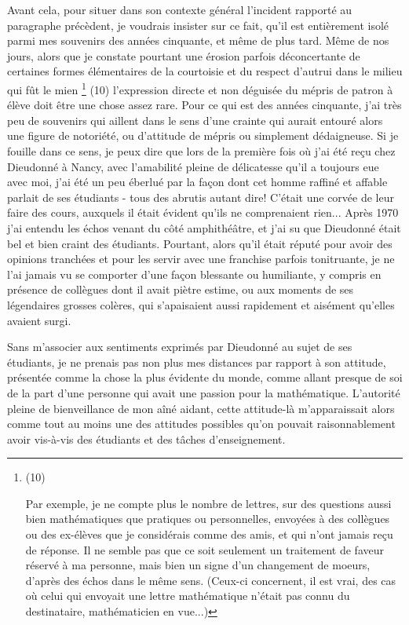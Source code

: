 Avant cela, pour situer dans son contexte général l'incident rapporté au paragraphe précèdent, je voudrais insister sur ce fait, qu'il est entièrement isolé parmi mes souvenirs des années cinquante, et même de plus tard. Même de nos jours, alors que je constate pourtant une érosion parfois déconcertante de certaines formes élémentaires de la courtoisie et du respect d'autrui dans le milieu qui fût le mien \footnote{(10)\par Par exemple, je ne compte plus le nombre de lettres, sur des questions aussi bien mathématiques que pratiques ou personnelles, envoyées à des collègues ou des ex-élèves que je considérais comme des amis, et qui n'ont jamais reçu de réponse. Il ne semble pas que ce soit seulement un traitement de faveur réservé à ma personne, mais bien un signe d'un changement de moeurs, d'après des échos dans le même sens. (Ceux-ci concernent, il est vrai, des cas où celui qui envoyait une lettre mathématique n'était pas connu du destinataire, mathématicien en vue...)} (10) l'expression directe et non déguisée du mépris de patron à élève doit être une chose assez rare. Pour ce qui est des années cinquante, j'ai très peu de souvenirs qui aillent dans le sens d'une crainte qui aurait entouré alors une figure de notoriété, ou d'attitude de mépris ou simplement dédaigneuse. Si je fouille dans ce sens, je peux dire que lors de la première fois où j'ai été reçu chez Dieudonné à Nancy, avec l'amabilité pleine de délicatesse qu'il a toujours eue avec moi, j'ai été un peu éberlué par la façon dont cet homme raffiné et affable parlait de ses étudiants - tous des abrutis autant dire! C'était une corvée de leur faire des cours, auxquels il était évident qu'ils ne comprenaient rien... Après 1970 j'ai entendu les échos venant du côté amphithéâtre, et j'ai su que Dieudonné était bel et bien craint des étudiants. Pourtant, alors qu'il était réputé pour avoir des opinions tranchées et pour les servir avec une franchise parfois tonitruante, je ne l'ai jamais vu se comporter d'une façon blessante ou humiliante, y compris en présence de collègues dont il avait piètre estime, ou aux moments de ses légendaires grosses colères, qui s'apaisaient aussi rapidement et aisément qu'elles avaient surgi.

Sans m'associer aux sentiments exprimés par Dieudonné au sujet de ses étudiants, je ne prenais pas non plus mes distances par rapport à son attitude, présentée comme la chose la plus évidente du monde, comme allant presque de soi de la part d'une personne qui avait une passion pour la mathématique. L'autorité pleine de bienveillance de mon aîné aidant, cette attitude-là m'apparaissait alors comme tout au moins une des attitudes possibles qu'on pouvait raisonnablement avoir vis-à-vis des étudiants et des tâches d'enseignement.

